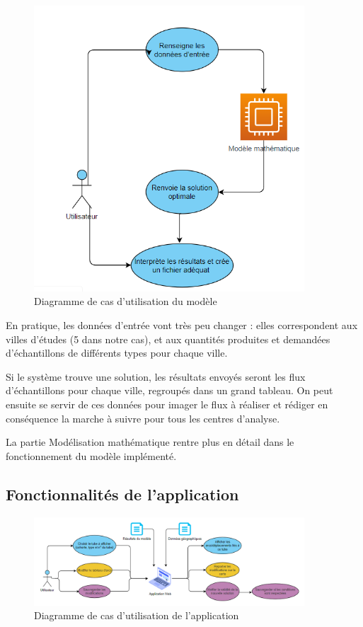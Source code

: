 \documentclass{polytech/polytech}
\numberwithin{figure}{chapter}
\begin{document}
\begin{figure}[h!]
    \centering
    \includegraphics[width=0.9\textwidth, scale=0.8]{pic/usecasemodele.png}
    \caption{Diagramme de cas d'utilisation du modèle}
    \label{Diagramme de cas d'utilisation du modèle}
\end{figure}

En pratique, les données d'entrée vont très peu changer : elles correspondent aux villes d'études (5 dans notre cas), et aux quantités produites et demandées d'échantillons de différents types pour chaque ville.

Si le système trouve une solution, les résultats envoyés seront les flux d'échantillons pour chaque ville, regroupés dans un grand tableau. On peut ensuite se servir de ces données pour imager le flux à réaliser et rédiger en conséquence la marche à suivre pour tous les centres d'analyse.

La partie Modélisation mathématique rentre plus en détail dans le fonctionnement du modèle implémenté.

\subsection{Fonctionnalités de l'application}

\begin{figure}[h!]
    \centering
    \includegraphics[width=0.9\textwidth]{pic/usecaseapp.png}
    \caption{Diagramme de cas d'utilisation de l'application}
    \label{Diagramme de cas d'utilisation de l'application}
\end{figure}
\end{document}
